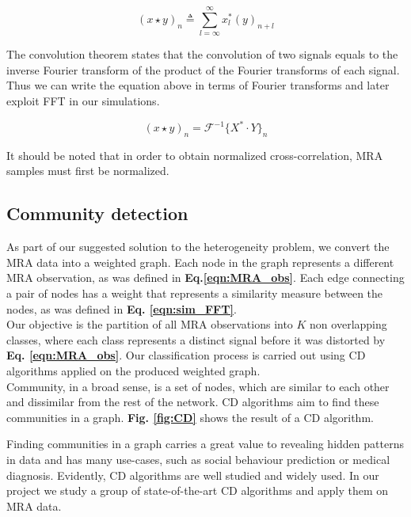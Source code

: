 \begin{equation}
\label{eqn:sim_def}
(x \star y)_n \triangleq \sum_{l=\infty}^{\infty}x^*_l(y)_{n+l}
\end{equation}

The convolution theorem states that the convolution of two signals  equals to the inverse Fourier transform of the product of the Fourier transforms of each signal. Thus we can write the equation above in terms of Fourier transforms and later exploit \acrshort{FFT} in our simulations.

\begin{equation}
\label{eqn:sim_FFT}
(x \star y)_n = \mathcal{F}^{-1}\lbrace X^* \cdot Y {\rbrace}_n
\end{equation}

It should be noted that in order to obtain normalized cross-correlation, \acrshort{MRA} samples must first be normalized.

\clearpage

\subsection{Community detection}

As part of our suggested solution to the heterogeneity problem, we convert the \acrshort{MRA} data into a weighted graph. Each node in the graph represents a different \acrshort{MRA} observation, as was defined in \textbf{Eq.\ref{eqn:MRA_obs}}. Each edge connecting a pair of nodes has a weight that represents a similarity measure between the nodes, as was defined in \textbf{Eq. \ref{eqn:sim_FFT}}.\\

Our objective is the partition of all \acrshort{MRA} observations into $K$ non overlapping classes, where each class represents a distinct signal before it was distorted by \textbf{Eq. \ref{eqn:MRA_obs}}. Our classification process is carried out using \acrfull{CD} algorithms applied on the produced weighted graph.\\

Community, in a broad sense, is a set of nodes, which are similar to each other and dissimilar from the rest of the network. \acrfull{CD} algorithms aim to find these communities in a graph. \textbf{Fig. \ref{fig:CD}} shows the result of a \acrshort{CD} algorithm.

Finding communities in a graph carries a great value to revealing hidden patterns in data and has many use-cases, such as social behaviour prediction \cite{zachary1976} or medical diagnosis\cite{guimera2005}. Evidently, \acrlong{CD} algorithms are well studied and widely used. In our project we study a group of state-of-the-art \acrshort{CD} algorithms and apply them on \acrshort{MRA} data.\\

